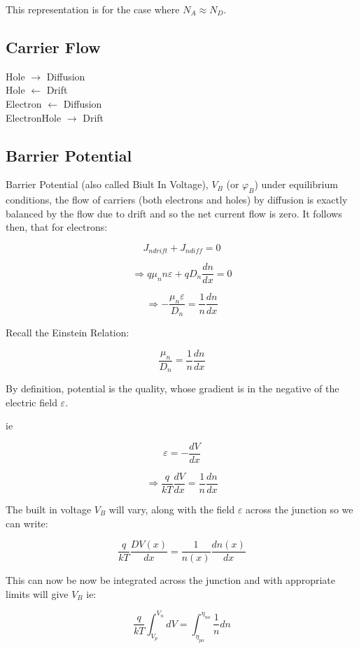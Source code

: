 \documentclass[a4paper,12pt]{article}
\begin{document}
This representation is for the case where $N_{A} \approx
N_{D}$.

\subsection{Carrier Flow}

Hole $\longrightarrow$ Diffusion \\
Hole $\longleftarrow$ Drift \\
Electron $\longleftarrow$ Diffusion \\
ElectronHole $\longrightarrow$ Drift \\

\subsection{Barrier Potential}

Barrier Potential (also called Biult In Voltage), $V_{B}$ (or
$\varphi_{B}$) under equilibrium conditions, the flow of carriers (both
electrons and holes) by diffusion is exactly balanced by the flow due to
drift and so the net current flow is zero. It follows then, that for
electrons:

\[ J_{n drift} + J_{n diff} = 0 \]

\[ \Rightarrow q \mu_{n} n \varepsilon + q D_{n} \frac{dn}{dx} = 0 \]

\[ \Rightarrow - \frac{\mu_{n} \varepsilon}{D_{n}} = \frac{1}{n}
\frac{dn}{dx} \]

Recall the Einstein Relation:

\[ \frac{\mu_{n}}{D_{n}} = \frac{1}{n} \frac{dn}{dx} \]

By definition, potential is the quality, whose gradient is in
the negative of the electric field $\varepsilon$.

ie

\[ \varepsilon = - \frac{dV}{dx} \]

\[ \Rightarrow \frac{q}{kT} \frac{dV}{dx} = \frac{1}{n} \frac{dn}{dx} \]

The built in voltage $V_{B}$ will vary, along with the field
$\varepsilon$ across the junction so we can write:

\[ \frac{q}{k T} \frac{DV(x)}{dx} = \frac{1}{n(x)} \frac{dn(x)}{dx} \]

This can now be now be integrated across the junction and with
appropriate limits will give $V_{B}$ ie:

\[ \frac{q}{kT} \int^{V_{n}}_{V_{p}} dV = \int^{\eta_{n o}}_{\eta_{p o}}
\frac{1}{n} dn \]
\end{document}
